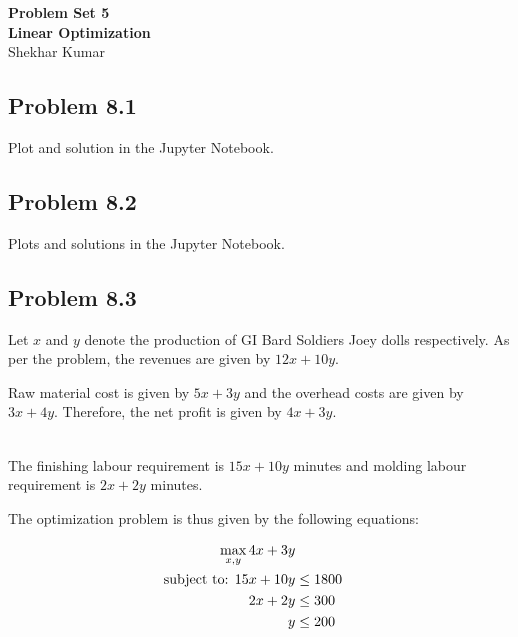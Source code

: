 \documentclass[letterpaper,12pt]{article}
\theoremstyle{definition}
\begin{document}
\begin{flushleft}
\textbf{\large{Problem Set 5}} \\
\vspace{2mm}
\textbf{\large{Linear Optimization}} \\
\vspace{2mm}
Shekhar Kumar\\
\end{flushleft}

\vspace{2mm}

\subsection*{Problem 8.1 }

Plot and solution in the Jupyter Notebook.


\subsection*{Problem 8.2}

Plots and solutions in the Jupyter Notebook.

\subsection*{Problem 8.3 }

Let $x$ and $y$ denote the production of GI Bard Soldiers Joey dolls respectively.
As per the problem, the revenues are given by $12x + 10y$. \
\begin{flushleft}
Raw material cost is given by $5x+3y$ and the overhead costs are given by
$3x+4y$. Therefore, the net profit is given by $4x +3y$. \\\

The finishing labour requirement is $15x+10y$ minutes and molding labour requirement is $2x+2y$ minutes.
\end{flushleft}
The optimization problem is thus given by the following equations:

\begin{align*}
  \max_{{x,y}}4x+3y\\
  \textnormal{subject to: } 15x+10y &\leq 1800\\
   2x+2y &\leq 300\\
   y &\leq 200
\end{align*}
\end{document}
